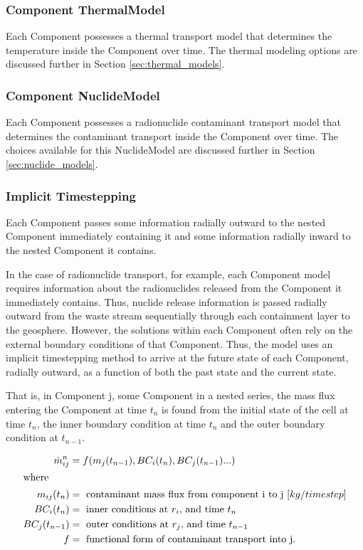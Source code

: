 \subsubsection{Component ThermalModel}

Each Component possesses a thermal transport model that determines the 
temperature inside the Component over time. The thermal modeling options are 
discussed further in Section \ref{sec:thermal_models}.  

\subsubsection{Component NuclideModel}

Each Component possesses a radionuclide contaminant transport model that 
determines the contaminant transport inside the Component over time. The 
choices available for this NuclideModel are discussed further in Section 
\ref{sec:nuclide_models}. 

\subsubsection{Implicit Timestepping}

Each Component passes some information radially outward to the nested 
Component immediately containing it and some information radially 
inward to the nested Component it contains. 


In the case of radionuclide transport, for example, each Component model
requires information about the radionuclides released from the Component it
immediately contains.  Thus, nuclide release information is passed radially
outward from the waste stream sequentially through each containment layer to
the geosphere. However, the solutions within each Component often rely on the
external boundary conditions of that Component.  Thus, the \Cyder model uses an
implicit timestepping method to arrive at the future state of each Component,
radially outward, as a function of both the past state and the current state. 

That is, in Component j, some Component in a nested series, the mass flux 
entering the Component at time $t_n$ is found from the initial state of the cell 
at time $t_n$, the inner boundary 
condition at time $t_n$ and the outer boundary condition at $t_{n-1}$.  

\begin{align}
  \dot{m}_{ij}^n &= f( m_j(t_{n-1}) , BC_i(t_n) , BC_j(t_{n-1}) . . . ) \nonumber\\
  \intertext{where}
  m_{ij}(t_n) &= \mbox{ contaminant mass flux from component i to j }[kg/timestep]\nonumber\\
  BC_i(t_n)  &= \mbox{ inner conditions at }r_i\mbox{, and time }t_n \nonumber \\
  BC_j(t_{n-1})  &= \mbox{ outer conditions at }r_j\mbox{, and time }t_{n-1} \nonumber\\
  f &= \mbox{ functional form of contaminant transport into j. }\nonumber
\end{align}

